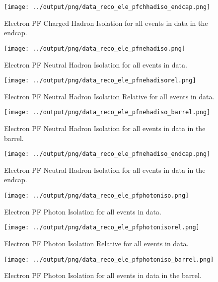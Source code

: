 \documentclass[11pt]{book}
\begin{document}
\begin{figure}[htb]
\centering
\texttt{[image: ../output/png/data\_reco\_ele\_pfchhadiso\_endcap.png]}
\caption{Electron PF Charged Hadron Isolation for all events in data in the endcap.}
\label{fig:data_ele_pfchhadiso_endcap}
\end{figure}


\begin{figure}[htb]
\centering
\texttt{[image: ../output/png/data\_reco\_ele\_pfnehadiso.png]}
\caption{Electron PF Neutral Hadron Isolation for all events in data.}
\label{fig:data_ele_pfnehadiso}
\end{figure}

\begin{figure}[htb]
\centering
\texttt{[image: ../output/png/data\_reco\_ele\_pfnehadisorel.png]}
\caption{Electron PF Neutral Hadron Isolation Relative for all events in data.}
\label{fig:data_ele_pfnehadisorel}
\end{figure}

\begin{figure}[htb]
\centering
\texttt{[image: ../output/png/data\_reco\_ele\_pfnehadiso\_barrel.png]}
\caption{Electron PF Neutral Hadron Isolation for all events in data in the barrel.}
\label{fig:data_ele_pfnehadiso_barrel}
\end{figure}

\begin{figure}[htb]
\centering
\texttt{[image: ../output/png/data\_reco\_ele\_pfnehadiso\_endcap.png]}
\caption{Electron PF Neutral Hadron Isolation for all events in data in the endcap.}
\label{fig:data_ele_pfnehadiso_endcap}
\end{figure}


\begin{figure}[htb]
\centering
\texttt{[image: ../output/png/data\_reco\_ele\_pfphotoniso.png]}
\caption{Electron PF Photon Isolation for all events in data.}
\label{fig:data_ele_pfphotoniso}
\end{figure}

\begin{figure}[htb]
\centering
\texttt{[image: ../output/png/data\_reco\_ele\_pfphotonisorel.png]}
\caption{Electron PF Photon Isolation Relative for all events in data.}
\label{fig:data_ele_pfphotonisorel}
\end{figure}

\begin{figure}[htb]
\centering
\texttt{[image: ../output/png/data\_reco\_ele\_pfphotoniso\_barrel.png]}
\caption{Electron PF Photon Isolation for all events in data in the barrel.}
\label{fig:data_ele_pfphotoniso_barrel}
\end{figure}
\end{document}

